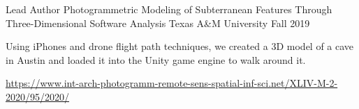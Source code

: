 

\begin{cventries}

  \cventry
  {Lead Author} %
  {Photogrammetric Modeling of Subterranean Features Through Three-Dimensional Software Analysis} %
  {Texas A\&M University} %
  {Fall 2019} %
  {
    \begin{cvitems} %
      \item{Using iPhones and drone flight path techniques, we created a 3D model of a cave in Austin and loaded it into the Unity game engine to walk around it.}
      \item{\href{https://www.int-arch-photogramm-remote-sens-spatial-inf-sci.net/XLIV-M-2-2020/95/2020/}{https://www.int-arch-photogramm-remote-sens-spatial-inf-sci.net/XLIV-M-2-2020/95/2020/}}
    \end{cvitems}
  }

\end{cventries}
